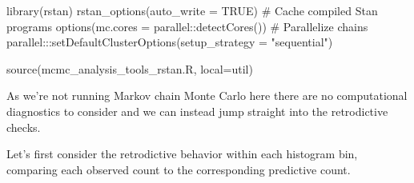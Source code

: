\documentclass[
  letterpaper,
  DIV=11,
  numbers=noendperiod]{scrartcl}
\newenvironment{Shaded}{\begin{snugshade}}{\end{snugshade}}
\newcommand{\AttributeTok}[1]{\textcolor[rgb]{0.40,0.45,0.13}{#1}}
\newcommand{\CommentTok}[1]{\textcolor[rgb]{0.37,0.37,0.37}{#1}}
\newcommand{\ConstantTok}[1]{\textcolor[rgb]{0.56,0.35,0.01}{#1}}
\newcommand{\DecValTok}[1]{\textcolor[rgb]{0.68,0.00,0.00}{#1}}
\newcommand{\FunctionTok}[1]{\textcolor[rgb]{0.28,0.35,0.67}{#1}}
\newcommand{\NormalTok}[1]{\textcolor[rgb]{0.00,0.23,0.31}{#1}}
\newcommand{\OtherTok}[1]{\textcolor[rgb]{0.00,0.23,0.31}{#1}}
\newcommand{\SpecialCharTok}[1]{\textcolor[rgb]{0.37,0.37,0.37}{#1}}
\newcommand{\StringTok}[1]{\textcolor[rgb]{0.13,0.47,0.30}{#1}}
\begin{document}
\begin{Shaded}
\begin{Highlighting}[]
\FunctionTok{library}\NormalTok{(rstan)}
\FunctionTok{rstan\_options}\NormalTok{(}\AttributeTok{auto\_write =} \ConstantTok{TRUE}\NormalTok{)            }\CommentTok{\# Cache compiled Stan programs}
\FunctionTok{options}\NormalTok{(}\AttributeTok{mc.cores =}\NormalTok{ parallel}\SpecialCharTok{::}\FunctionTok{detectCores}\NormalTok{()) }\CommentTok{\# Parallelize chains}
\NormalTok{parallel}\SpecialCharTok{:::}\FunctionTok{setDefaultClusterOptions}\NormalTok{(}\AttributeTok{setup\_strategy =} \StringTok{"sequential"}\NormalTok{)}

\FunctionTok{source}\NormalTok{(}\StringTok{\textquotesingle{}mcmc\_analysis\_tools\_rstan.R\textquotesingle{}}\NormalTok{, }\AttributeTok{local=}\NormalTok{util)}
\end{Highlighting}
\end{Shaded}

\begin{Shaded}
\end{Shaded}

As we're not running Markov chain Monte Carlo here there are no
computational diagnostics to consider and we can instead jump straight
into the retrodictive checks.

Let's first consider the retrodictive behavior within each histogram
bin, comparing each observed count to the corresponding predictive
count.
\end{document}
